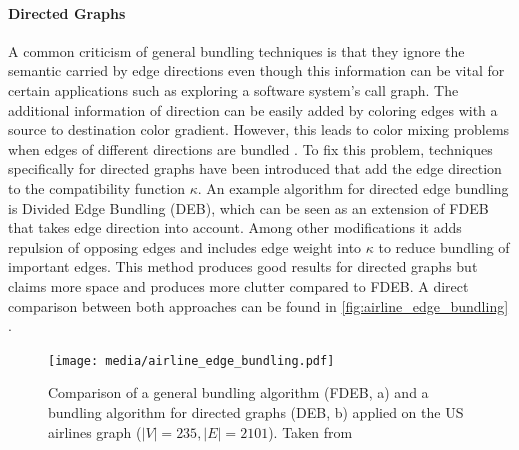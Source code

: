 \paragraph*{Directed Graphs}  A common criticism of general bundling techniques is that they ignore the semantic carried by edge directions even though this information can be vital for certain applications such as exploring a software system's call graph. The additional information of direction can be easily added by coloring edges with a source to destination color gradient. However, this leads to color mixing problems when edges of different directions are bundled \cite{Lhuillier2017}. To fix this problem, techniques specifically for directed graphs have been introduced that add the edge direction to the compatibility function $\kappa$. An example algorithm for directed edge bundling is Divided Edge Bundling (DEB)\cite{Selassie2011}, which can be seen as an extension of FDEB that takes edge direction into account. Among other modifications it adds repulsion of opposing edges and includes edge weight into $\kappa$ to reduce bundling of important edges. This method produces good results for directed graphs but claims more space and produces more clutter compared to FDEB. A direct comparison between both approaches can be found in \autoref{fig:airline_edge_bundling} \cite{Lhuillier2017}.\\


\begin{figure}
    \centering
    \texttt{[image: media/airline\_edge\_bundling.pdf]}
    \caption{Comparison of a general bundling algorithm (FDEB, a) and a bundling algorithm for directed graphs (DEB, b) applied on the US airlines graph ($|V| = 235, |E| = 2101$). Taken from\cite{Lhuillier2017}}
    \label{fig:airline_edge_bundling}
\end{figure}


